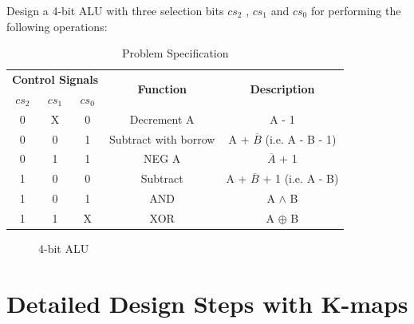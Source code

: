 \documentclass[18pt]{article}
\begin{document}
\large
Design a 4-bit ALU with three selection bits $cs_{2}$ , 
$cs_{1}$ and $cs_{0}$ for performing the following 
operations: \par
\normalsize

\vspace{7mm}
\begin{table}[!h]
    \captionsetup{font=Large}
    \centering
    \begin{tabular}{||c|c|c|c|c||}
    \hline
    \multicolumn{3}{||c|}{\textbf{Control Signals}} & \multirow{2}{*}{\textbf{Function}} &  \multirow{2}{*}{\textbf{Description}} \\ \cline{1-3}
     $cs_{2}$ & $cs_{1}$ & $cs_{0}$ & &\\ \hline
     \hline
     0 & X & 0 & Decrement A & A - 1 \\ \hline
     0 & 0 & 1 & Subtract with borrow & A + $\overline{B}$ (i.e. A - B - 1) \\ \hline
     0 & 1 & 1 & NEG A & $\overline{A}$ + 1\\ \hline
     1 & 0 & 0 & Subtract & A + $\overline{B}$ + 1 (i.e. A - B)\\ \hline
     1 & 0 & 1 & AND & A $\land$ B\\ \hline
     1 & 1 & X & XOR & A $\oplus$ B\\ 
    \hline
    \end{tabular}
    \caption{Problem Specification}
\end{table}



\begin{figure}[!h]
    \captionsetup{font=Large}
    \centering
    \caption{4-bit ALU}
\end{figure}

\newpage
\section{Detailed Design Steps with K-maps}
\end{document}
